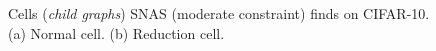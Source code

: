 \documentclass{article} \usepackage{iclr2019_conference,times}
\begin{document}
\begin{figure}[h]
  \centering
  \caption{Cells (\textit{child graphs}) SNAS (moderate constraint) finds on CIFAR-10. (a) Normal cell. (b) Reduction cell.}
  \label{fig:normal_reduction_moderate}
\end{figure}
\end{document}
